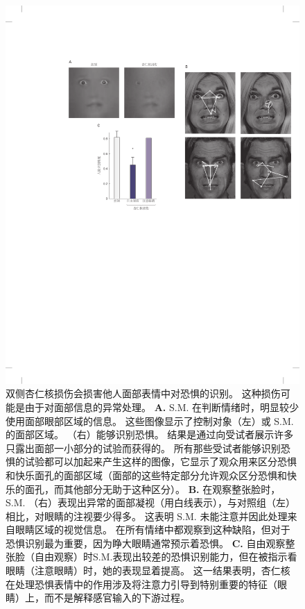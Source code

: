 \begin{figure}[htbp]
	\centering
	\includegraphics[width=0.95\linewidth]{chap42/fig_42_7}
	\caption{双侧杏仁核损伤会损害他人面部表情中对恐惧的识别。
		这种损伤可能是由于对面部信息的异常处理。
		\textbf{A.} S.M. 在判断情绪时，明显较少使用面部眼部区域的信息。
		这些图像显示了控制对象（左）或 S.M. 的面部区域。
		（右）能够识别恐惧。
		结果是通过向受试者展示许多只露出面部一小部分的试验而获得的。
		所有那些受试者能够识别恐惧的试验都可以加起来产生这样的图像，它显示了观众用来区分恐惧和快乐面孔的面部区域（面部的这些特定部分允许观众区分恐惧和快乐的面孔，而其他部分无助于这种区分）。
		\textbf{B.} 在观察整张脸时，S.M. （右）表现出异常的面部凝视（用白线表示），与对照组（左）相比，对眼睛的注视要少得多。
		这表明 S.M. 未能注意并因此处理来自眼睛区域的视觉信息。
		在所有情绪中都观察到这种缺陷，但对于恐惧识别最为重要，因为睁大眼睛通常预示着恐惧。
		\textbf{C.} 自由观察整张脸（自由观察）时S.M.表现出较差的恐惧识别能力，但在被指示看眼睛（注意眼睛）时，她的表现显着提高。
		这一结果表明，杏仁核在处理恐惧表情中的作用涉及将注意力引导到特别重要的特征（眼睛）上，而不是解释感官输入的下游过程。}
	\label{fig:42_7}
\end{figure}



